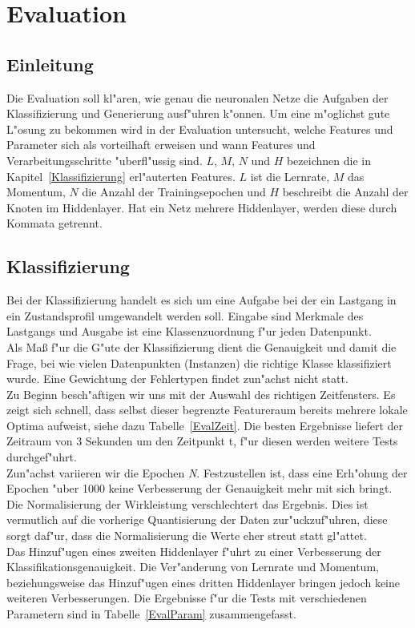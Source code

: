 \section{Evaluation}
\label{Evaluation}

\subsection{Einleitung}
\label{Einleitung}
Die Evaluation soll kl"aren, wie genau die neuronalen Netze die Aufgaben der Klassifizierung und Generierung ausf"uhren k"onnen. Um eine m"oglichst gute L"osung zu bekommen wird in der Evaluation untersucht, welche Features und Parameter sich als vorteilhaft erweisen und wann Features und Verarbeitungsschritte "uberfl"ussig sind. $L$, $M$, $N$ und $H$ bezeichnen die in Kapitel~\ref{Klassifizierung} erl"auterten Features. $L$ ist die Lernrate, $M$ das Momentum, $N$ die Anzahl der Trainingsepochen und $H$ beschreibt die Anzahl der Knoten im Hiddenlayer. Hat ein Netz mehrere Hiddenlayer, werden diese durch Kommata getrennt.

\subsection{Klassifizierung}
\label{EvalKlassifizierung}
Bei der Klassifizierung handelt es sich um eine Aufgabe bei der ein Lastgang in ein Zustandsprofil umgewandelt werden soll. Eingabe sind Merkmale des Lastgangs und Ausgabe ist eine Klassenzuordnung f"ur jeden Datenpunkt.\\
Als Ma{\ss} f"ur die G"ute der Klassifizierung dient die Genauigkeit und damit die Frage, bei wie vielen Datenpunkten (Instanzen) die richtige Klasse klassifiziert wurde. Eine Gewichtung der Fehlertypen findet zun"achst nicht statt.\\

Zu Beginn besch"aftigen wir uns mit der Auswahl des richtigen Zeitfensters. Es zeigt sich schnell, dass selbst dieser begrenzte Featureraum bereits mehrere lokale Optima aufweist, siehe dazu Tabelle~\ref{EvalZeit}. Die besten Ergebnisse liefert der Zeitraum von 3 Sekunden um den Zeitpunkt t, f"ur diesen werden weitere Tests durchgef"uhrt.\\

Zun"achst variieren wir die Epochen \textit{N}. Festzustellen ist, dass eine Erh"ohung der Epochen "uber 1000 keine Verbesserung der Genauigkeit mehr mit sich bringt. Die Normalisierung der Wirkleistung verschlechtert das Ergebnis. Dies ist vermutlich auf die vorherige Quantisierung der Daten zur"uckzuf"uhren, diese sorgt daf"ur, dass die Normalisierung die Werte eher streut statt gl"attet. \\
Das Hinzuf"ugen eines zweiten Hiddenlayer f"uhrt zu einer Verbesserung der Klassifikationsgenauigkeit. Die Ver"anderung von Lernrate und Momentum, beziehungsweise das Hinzuf"ugen eines dritten Hiddenlayer bringen jedoch keine weiteren Verbesserungen. Die Ergebnisse f"ur die Tests mit verschiedenen Parametern sind in Tabelle~\ref{EvalParam} zusammengefasst.\\

